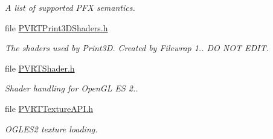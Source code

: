 \begin{DoxyCompactItemize}
\begin{DoxyCompactList}\small\item\em A list of supported P\+F\+X semantics. \end{DoxyCompactList}\item 
file \hyperlink{_p_v_r_t_print3_d_shaders_8h}{P\+V\+R\+T\+Print3\+D\+Shaders.\+h}
\begin{DoxyCompactList}\small\item\em The shaders used by Print3\+D. Created by Filewrap 1.. D\+O N\+O\+T E\+D\+I\+T. \end{DoxyCompactList}\item 
file \hyperlink{_p_v_r_t_shader_8h}{P\+V\+R\+T\+Shader.\+h}
\begin{DoxyCompactList}\small\item\em Shader handling for Open\+G\+L E\+S 2.. \end{DoxyCompactList}\item 
file \hyperlink{_2_p_v_r_t_texture_a_p_i_8h}{P\+V\+R\+T\+Texture\+A\+P\+I.\+h}
\begin{DoxyCompactList}\small\item\em O\+G\+L\+E\+S2 texture loading. \end{DoxyCompactList}\end{DoxyCompactItemize}
